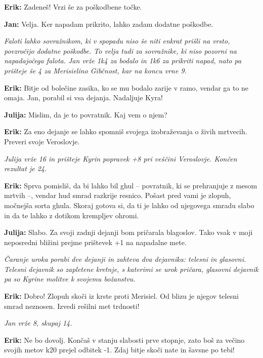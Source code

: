\textbf{Erik:} Zadeneš! Vrzi še za poškodbene točke.

\textbf{Jan:} Velja. Ker napadam prikrito, lahko zadam dodatne poškodbe.

\vspace{20pt}
\textit{Faloti lahko sovražnikom, ki v spopadu niso še niti enkrat prišli na vrsto, povzročijo dodatne poškodbe. To velja tudi za sovražnike, ki niso pozorni na napadajočega falota. Jan vrže 1k4 za bodalo in 1k6 za prikriti napad, nato pa prišteje še 4 za Merisielino Gibčnost, kar na koncu vrne 9.}
\vspace{20pt}

\textbf{Erik:} Bitje od bolečine zasika, ko se mu bodalo zarije v ramo, vendar ga to ne omaja. Jan, porabil si vsa dejanja. Nadaljuje Kyra!

\textbf{Julija:} Mislim, da je to povratnik. Kaj vem o njem?

\textbf{Erik:} Za eno dejanje se lahko spomniš svojega izobraževanja o živih mrtvecih. Preveri svoje Veroslovje.

\vspace{20pt}
\textit{Julija vrže 16 in prišteje Kyrin popravek +8 pri veščini Veroslovje. Končen rezultat je 24.}
\vspace{20pt}

\textbf{Erik:} Sprva pomisliš, da bi lahko bil ghul -- povratnik, ki se prehranjuje z mesom mrtvih --, vendar hud smrad razkrije resnico. Pošast pred vami je zlopuh, močnejša sorta ghula. Skoraj gotova si, da ti je lahko od njegovega smradu slabo in da te lahko z dotikom krempljev ohromi.

\textbf{Julija:} Slabo. Za svoji zadnji dejanji bom pričarala blagoslov. Tako vsak v moji neposredni bližini prejme prištevek +1 na napadalne mete.

\vspace{20pt}
\textit{Čaranje uroka porabi dve dejanji in zahteva dva dejavnika: telesni in glasovni. Telesni dejavnik so zapletene kretnje, s katerimi se urok pričara, glasovni dejavnik pa so Kyrine molitve k svojemu božanstvu.}
\vspace{20pt}

\textbf{Erik:} Dobro! Zlopuh skoči iz krste proti Merisiel. Od blizu je njegov telesni smrad neznosen. Izvedi rešilni met trdnosti!

\vspace{20pt}
\textit{Jan vrže 8, skupaj 14.}
\vspace{20pt}

\textbf{Erik:} Ne bo dovolj. Končaš v stanju slabosti prve stopnje, zato boš za večino svojih metov k20 prejel odbitek -1. Zdaj bitje skoči nate in šavsne po tebi!

